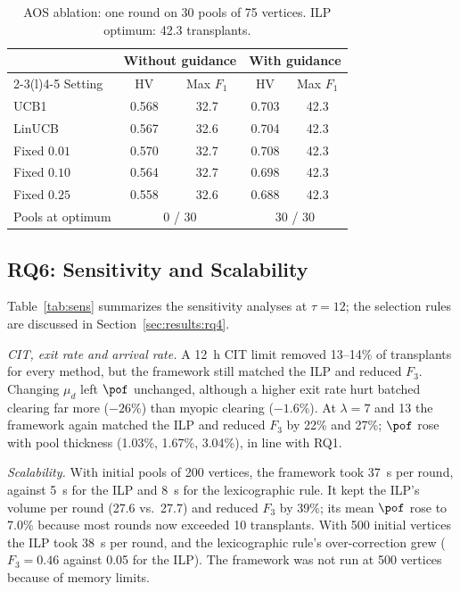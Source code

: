 \begin{table}[!t]
\centering
\caption{AOS ablation: one round on 30 pools of 75 vertices.
ILP optimum: 42.3 transplants.}
\label{tab:ablation}
\footnotesize
\setlength{\tabcolsep}{3pt}
\begin{tabular}{@{}lcccc@{}}
\toprule
& \multicolumn{2}{c}{Without guidance} & \multicolumn{2}{c}{With guidance} \\
\cmidrule(lr){2-3}\cmidrule(l){4-5}
Setting & HV & Max $F_1$ & HV & Max $F_1$ \\
\midrule
UCB1          & 0.568 & 32.7 & 0.703 & 42.3 \\
LinUCB        & 0.567 & 32.6 & 0.704 & 42.3 \\
Fixed $0.01$  & 0.570 & 32.7 & 0.708 & 42.3 \\
Fixed $0.10$  & 0.564 & 32.7 & 0.698 & 42.3 \\
Fixed $0.25$  & 0.558 & 32.6 & 0.688 & 42.3 \\
\midrule
Pools at optimum & \multicolumn{2}{c}{0 / 30} & \multicolumn{2}{c}{30 / 30} \\
\bottomrule
\end{tabular}
\end{table}

\subsection{RQ6: Sensitivity and Scalability}
\label{sec:results:rq6}

Table~\ref{tab:sens} summarizes the sensitivity analyses at
$\tau = 12$; the selection rules are discussed in
Section~\ref{sec:results:rq4}.

\emph{CIT, exit rate and arrival rate.} A 12~h CIT limit removed
13--14\% of transplants for every method, but the framework still
matched the ILP and reduced $F_3$. Changing $\mu_d$ left $\pof$
unchanged, although a higher exit rate hurt batched clearing far more
($-26\%$) than myopic clearing ($-1.6\%$). At $\lambda = 7$ and 13 the
framework again matched the ILP and reduced $F_3$ by 22\% and 27\%;
$\pof$ rose with pool thickness (1.03\%, 1.67\%, 3.04\%), in line with
RQ1.

\emph{Scalability.} With initial pools of 200 vertices, the framework
took 37~s per round, against 5~s for the ILP and 8~s for the
lexicographic rule. It kept the ILP's volume per round (27.6 vs.\
27.7) and reduced $F_3$ by 39\%; its mean $\pof$ rose to 7.0\%
because most rounds now exceeded 10 transplants. With 500 initial
vertices the ILP took 38~s per round, and the lexicographic rule's
over-correction grew ($F_3 = 0.46$ against 0.05 for the ILP). The
framework was not run at 500 vertices because of memory limits.

